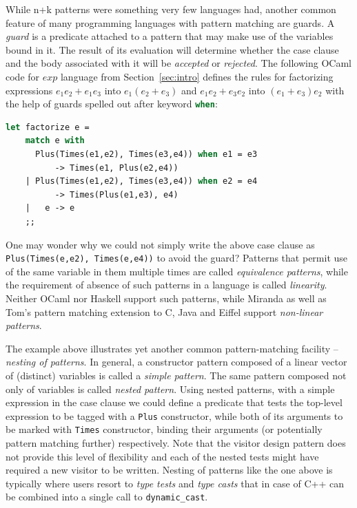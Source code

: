 \documentclass[preprint]{sigplanconf}
\makeatletter
\DeclareRobustCommand{\code}[1]{{\lstinline[breaklines=false,escapechar=@]{#1}}}
\DeclareRobustCommand{\codeocaml}[1]{{\lstinline[breaklines=false,language=Caml]{#1}}}
\makeatother
\begin{document}
While n+k patterns were something very few languages had, another common feature of 
many programming languages with pattern matching are guards. A \emph{guard} 
is a predicate attached to a pattern that may make use of the variables bound in 
it. The result of its evaluation will determine whether the case clause and the 
body associated with it will be \emph{accepted} or \emph{rejected}. The 
following OCaml code for $exp$ language from Section~\ref{sec:intro} defines the 
rules for factorizing expressions $e_1e_2+e_1e_3$ into $e_1(e_2+e_3)$ and 
$e_1e_2+e_3e_2$ into $(e_1+e_3)e_2$ with the help of guards spelled out after 
keyword \codeocaml{when}:

\begin{lstlisting}[language=Caml,keepspaces,columns=flexible]
let factorize e =
    match e with
      Plus(Times(e1,e2), Times(e3,e4)) when e1 = e3 
          -> Times(e1, Plus(e2,e4))
    | Plus(Times(e1,e2), Times(e3,e4)) when e2 = e4 
          -> Times(Plus(e1,e3), e4)
    |   e -> e
    ;;
\end{lstlisting}

One may wonder why we could not simply write the above case clause as 
\codeocaml{Plus(Times(e,e2), Times(e,e4))} to avoid the guard? Patterns that 
permit use of the same variable in them multiple times are called 
\emph{equivalence patterns}, while the requirement of absence of such patterns 
in a language is called \emph{linearity}. Neither OCaml nor Haskell support such 
patterns, while Miranda\cite{Miranda85} as well as Tom's pattern matching 
extension to C, Java and Eiffel\cite{Moreau:2003} support \emph{non-linear 
patterns}.

The example above illustrates yet another common pattern-matching facility -- 
\emph{nesting of patterns}. In general, a constructor pattern composed of a 
linear vector of (distinct) variables is called a \emph{simple pattern}. The 
same pattern composed not only of variables is called \emph{nested pattern}.
Using nested patterns, with a simple expression in the case clause we could
define a predicate that tests the top-level expression to be tagged with a
\codeocaml{Plus} constructor, while both of its arguments to be marked with 
\codeocaml{Times} constructor, binding their arguments (or potentially pattern 
matching further) respectively. Note that the visitor design pattern does not 
provide this level of flexibility and each of the nested tests might have 
required a new visitor to be written. Nesting of patterns like the one above is 
typically where users resort to \emph{type tests} and \emph{type casts} that in 
case of C++ can be combined into a single call to \code{dynamic_cast}.
\end{document}

